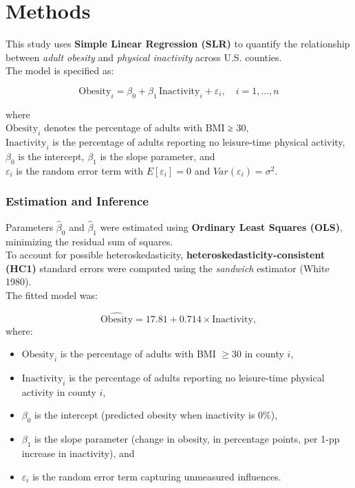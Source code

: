 \documentclass[
  letterpaper,
  DIV=11,
  numbers=noendperiod]{scrartcl}
\providecommand{\tightlist}{%
  \setlength{\itemsep}{0pt}\setlength{\parskip}{0pt}}\usepackage{longtable,booktabs,array}
\begin{document}
\section{Methods}\label{methods}

This study uses \textbf{Simple Linear Regression (SLR)} to quantify the
relationship between \emph{adult obesity} and \emph{physical inactivity}
across U.S. counties.\\
The model is specified as:

\[
\text{Obesity}_i = \beta_0 + \beta_1 \, \text{Inactivity}_i + \varepsilon_i, \quad i = 1, \dots, n
\]

where\\
\(\text{Obesity}_i\) denotes the percentage of adults with BMI ≥ 30,\\
\(\text{Inactivity}_i\) is the percentage of adults reporting no
leisure-time physical activity,\\
\(\beta_0\) is the intercept, \(\beta_1\) is the slope parameter, and\\
\(\varepsilon_i\) is the random error term with \(E[\varepsilon_i] = 0\)
and \(Var(\varepsilon_i) = \sigma^2\).

\subsubsection{Estimation and Inference}\label{estimation-and-inference}

Parameters \(\hat{\beta}_0\) and \(\hat{\beta}_1\) were estimated using
\textbf{Ordinary Least Squares (OLS)}, minimizing the residual sum of
squares.\\
To account for possible heteroskedasticity,
\textbf{heteroskedasticity-consistent (HC1)} standard errors were
computed using the \emph{sandwich} estimator (White 1980).\\
The fitted model was:

\[
\widehat{\text{Obesity}} = 17.81 + 0.714 \times \text{Inactivity},
\] where:

\begin{itemize}
\tightlist
\item
  \(\text{Obesity}_i\) is the percentage of adults with BMI \(\ge 30\)
  in county \(i\),\\
\item
  \(\text{Inactivity}_i\) is the percentage of adults reporting no
  leisure-time physical activity in county \(i\),\\
\item
  \(\beta_0\) is the intercept (predicted obesity when inactivity is
  0\%),\\
\item
  \(\beta_1\) is the slope parameter (change in obesity, in percentage
  points, per 1-pp increase in inactivity), and\\
\item
  \(\varepsilon_i\) is the random error term capturing unmeasured
  influences.
\end{itemize}
\end{document}
